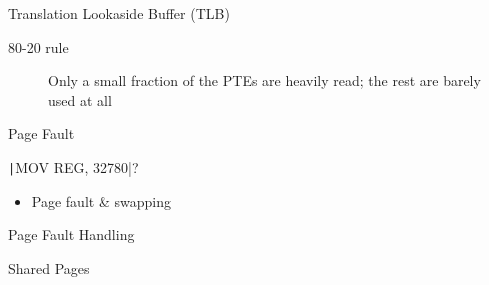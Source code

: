 \begin{frame}{Translation Lookaside Buffer (TLB)}
  \begin{description}
  \item[80-20 rule] Only a small fraction of the PTEs are heavily read; the rest are
    barely used at all
  \end{description}
  \centering
\end{frame}

\begin{frame}[fragile]{Page Fault}
  \begin{minipage}{.44\textwidth}
    \centering
  \end{minipage}\hfill
  \begin{minipage}{.4\textwidth}
    \texttt|MOV REG, 32780|?
    \begin{itemize}
    \item[\Symbol{➠}] Page fault \& swapping
    \end{itemize}
  \end{minipage}
\end{frame}

\begin{frame}{Page Fault Handling}
  \centering
  \mode<beamer>{ \texttt{[image: osc-9-14]} }%
\end{frame}


\begin{frame}{Shared Pages}
  \centering
  \mode<beamer>{ \texttt{[image: osc-8-33]} }%
\end{frame}

